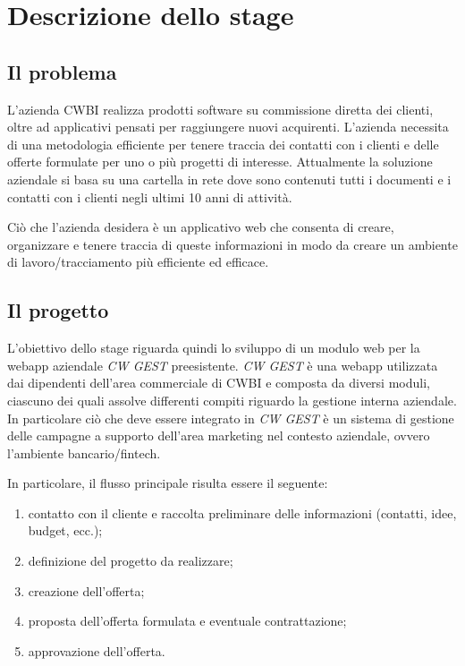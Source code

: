 \chapter{Descrizione dello stage}
\label{cap:descrizione-stage}


\setlength{\parskip}{3ex}

\section{Il problema}
L'azienda CWBI realizza prodotti software su commissione diretta dei clienti, oltre ad applicativi pensati per raggiungere nuovi acquirenti. L'azienda necessita di una metodologia efficiente per tenere traccia dei contatti con i clienti e delle offerte formulate per uno o più  progetti di interesse. Attualmente la soluzione aziendale si basa su una cartella in rete dove sono contenuti tutti i documenti e i contatti con i clienti negli ultimi 10 anni di attività.

\setlength{\parskip}{3ex}

\noindent Ciò che l'azienda desidera è un applicativo web che consenta di creare, organizzare e tenere traccia di queste informazioni in modo da creare un ambiente di lavoro/tracciamento più efficiente ed efficace. 

\section{Il progetto}
L'obiettivo dello stage riguarda quindi lo sviluppo di un modulo web per la webapp aziendale \textit{CW GEST} preesistente. \textit{CW GEST} è una webapp utilizzata dai dipendenti dell'area commerciale di CWBI e composta da diversi moduli, ciascuno dei quali assolve differenti compiti riguardo la gestione interna aziendale. In particolare ciò che deve essere integrato in \textit{CW GEST} è un sistema di gestione delle campagne a supporto dell'area marketing nel contesto aziendale, ovvero l'ambiente bancario/fintech. 

\setlength{\parskip}{3ex}

\noindent In particolare, il flusso principale risulta essere il seguente:
\begin{enumerate}
\item contatto con il cliente e raccolta preliminare delle informazioni (contatti, idee, budget, ecc.);
\item definizione del progetto da realizzare;
\item creazione dell'offerta;
\item proposta dell'offerta formulata e eventuale contrattazione;
\item approvazione dell'offerta.
\end{enumerate}


